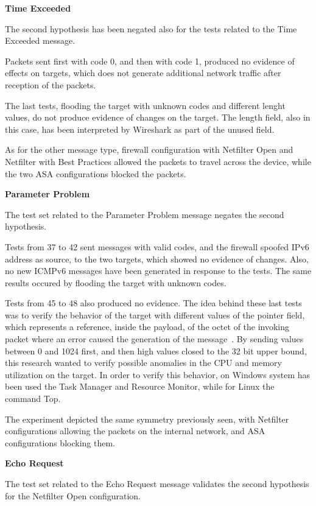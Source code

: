 \documentclass[12pt]{article}
\begin{document}
\textbf{Time Exceeded}

The second hypothesis has been negated also for the tests related to the Time Exceeded message.

Packets sent first with code 0, and then with code 1, produced no evidence of effects on targets, which does not generate additional network traffic after reception of the packets. 

The last tests, flooding the target with unknown codes and different lenght values, do not produce evidence of changes on the target. The length field, also in this case, has been interpreted by Wireshark as part of the unused field.

As for the other message type, firewall configuration with Netfilter Open and Netfilter with Best Practices allowed the packets to travel across the device, while the two ASA configurations blocked the packets.

\textbf{Parameter Problem}

The test set related to the Parameter Problem message negates the second hypothesis.

Tests from 37 to 42 sent messages with valid codes, and the firewall spoofed IPv6 address as source, to the two targets, which showed no evidence of changes. Also, no new ICMPv6 messages have been generated in response to the tests. The same results occured by flooding the target with unknown codes.

Tests from 45 to 48 also produced no evidence. The idea behind these last tests was to verify the behavior of the target with different values of the pointer field, which represents a reference, inside the payload, of the octet of the invoking packet where an error caused the generation of the message~\cite{rfc4443}. By sending values between 0 and 1024 first, and then high values closed to the 32 bit upper bound, this research wanted to verify possible anomalies in the CPU and memory utilization on the target. In order to verify this behavior, on Windows system has been used the Task Manager and Resource Monitor, while for Linux the command Top.

The experiment depicted the same symmetry previously seen, with Netfilter configurations allowing the packets on the internal network, and ASA configurations blocking them.

\textbf{Echo Request}

The test set related to the Echo Request message validates the second hypothesis for the Netfilter Open configuration.
\end{document}
